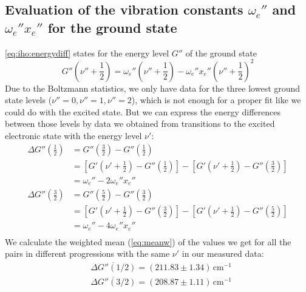 \subsection{Evaluation of the vibration constants \texorpdfstring{$\omega_e''$}{we''} and \texorpdfstring{$\omega_e'' x_e''$}{we''xe''} for the ground state}

\autoref{eq:iho:energydiff} states for the energy level $G''$ of the ground state
\begin{equation}
  G'' \left( \nu''+\frac{1}{2} \right) = \omega_e'' \left( \nu'' + \frac{1}{2} \right) - \omega_e'' x_e'' \left( \nu'' + \frac{1}{2} \right)^2 
\end{equation}
Due to the Boltzmann statistics, we only have data for the three lowest ground state levels
($\nu''=0,\nu''=1,\nu''=2$), which is
not enough for a proper fit like we could do with the excited state.
But we can express the energy differences between those levels by data we obtained from transitions
to the excited electronic state with the energy level $\nu'$:
\begin{equation}
\label{eq:DG}
\begin{split}
  \Delta G''\left( \frac{1}{2}\right)  &  =
   G''\left( \frac{3}{2}\right)-G''\left( \frac{1}{2}\right)   \\
 & = \left[G'\left(\nu'+\frac{1}{2}\right)-G''\left(\frac{1}{2}\right)\right]-
\left[G'\left(\nu'+\frac{1}{2}\right)-G''\left(\frac{3}{2}\right)\right]\\
& = \omega_e''-2\omega_e''x_e''\\
  \Delta G''\left( \frac{3}{2}\right)  &  =
   G''\left( \frac{5}{2}\right)-G''\left( \frac{3}{2}\right)\\
   & = \left[G'\left(\nu'+\frac{1}{2}\right)-G''\left(\frac{3}{2}\right)\right]-
\left[G'\left(\nu'+\frac{1}{2}\right)-G''\left(\frac{5}{2}\right)\right]\\
& = \omega_e''-4\omega_e''x_e''\\
  \end{split}
\end{equation}
We calculate the weighted mean (\autoref{eq:meanw}) of the values
we get for all the pairs in different progressions
with the same $\nu'$ in our measured data:
\begin{equation}
\begin{split}
 & \overline{\Delta G''(1/2)}= (211.83 \pm 1.34)\,\text{cm}^{-1}\\
 & \overline{\Delta G''(3/2)}= (208.87 \pm 1.11)\,\text{cm}^{-1}
 \end{split}
\end{equation}
